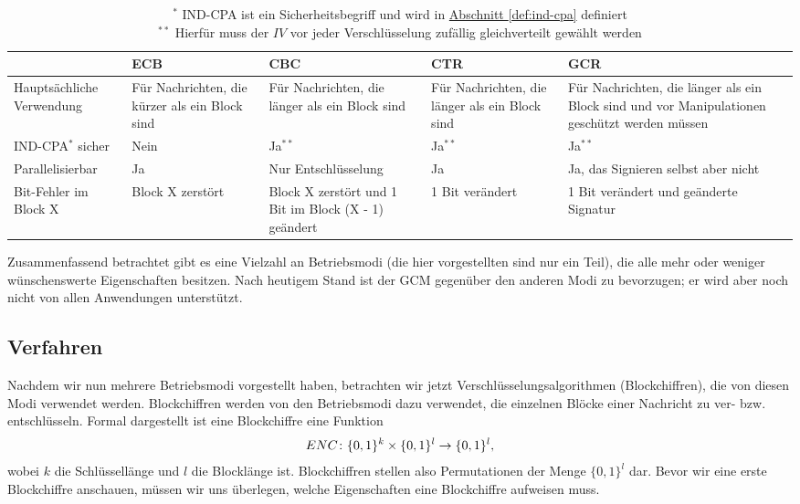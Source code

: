 \begin{table}[h]
\centering
	\begin{tabularx}{\textwidth}{ | X | X | X | X | X |} 
		\hline
		  & ECB & CBC & CTR & GCR \\ 
		\hline
		Hauptsächliche Verwendung & Für Nachrichten, die kürzer als ein Block sind & Für Nachrichten, die länger als ein Block sind 
		& Für Nachrichten, die länger als ein Block sind & Für Nachrichten, die länger als ein Block sind und vor Manipulationen geschützt werden müssen \\ 
		\hline
		\parbox{3cm}{IND-CPA\(^{\ast}\) } sicher & Nein & Ja\(^{\ast\ast}\) & Ja\(^{\ast\ast}\) & Ja\(^{\ast\ast}\) \\
		\hline
		 Parallelisierbar & Ja & Nur Entschlüsselung  & Ja & Ja, das Signieren selbst aber nicht \\ 
		\hline
		Bit-Fehler im Block X & Block X zerstört & Block X zerstört und 1 Bit im Block (X - 1) geändert 
		& 1 Bit verändert & 1 Bit verändert und geänderte Signatur \\
		\hline
	\end{tabularx}
	\caption{\(^{\ast}\) IND-CPA ist ein Sicherheitsbegriff und wird in \hyperref[def:ind-cpa]{Abschnitt \ref{def:ind-cpa}} definiert \\ 
		\(^{\ast\ast}\) Hierfür muss der \(IV\) vor jeder Verschlüsselung zufällig gleichverteilt gewählt werden}
\end{table}

\captionsetup[table]{labelformat=default}
\captionsetup[table]{singlelinecheck=true}
\captionsetup{font=normal}
 
\bigskip

Zusammenfassend betrachtet gibt es eine Vielzahl an Betriebsmodi (die hier vorgestellten sind nur ein Teil), die alle mehr oder weniger wünschenswerte Eigenschaften besitzen. Nach heutigem Stand ist der GCM gegenüber den anderen Modi zu bevorzugen; er wird aber noch nicht von allen Anwendungen unterstützt.

\subsection{Verfahren}
Nachdem wir nun mehrere Betriebsmodi vorgestellt haben, betrachten wir jetzt Verschlüsselungsalgorithmen (Blockchiffren), die von diesen Modi verwendet werden. Blockchiffren werden von den Betriebsmodi dazu verwendet, die einzelnen Blöcke einer Nachricht zu ver- bzw. entschlüsseln. Formal dargestellt ist eine Blockchiffre eine Funktion
\begin{align*}
	ENC \colon \{0, 1\}^k \times \{0, 1\}^l \rightarrow \{0, 1\}^l,
\end{align*}
wobei \(k\) die Schlüssellänge und \(l\) die Blocklänge ist. Blockchiffren stellen also Permutationen der Menge 
\(\{0, 1\}^l\) dar.
Bevor wir eine erste Blockchiffre anschauen, müssen wir uns überlegen, welche Eigenschaften eine Blockchiffre aufweisen muss.

